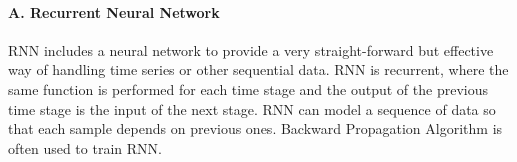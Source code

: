 


\paragraph{A. Recurrent Neural Network}

RNN \cite{manaswi2018rnn}\cite{tokgoz2018rnn}\cite{poulos2017rnn}includes a neural network to provide a very straight-forward but effective way of handling time series or other sequential data. RNN is recurrent, where the same function is performed for each time stage and the output of the previous time stage is the input of the next stage. RNN can model a sequence of data so that each sample  depends on previous ones. Backward Propagation Algorithm is often used to train RNN. 


